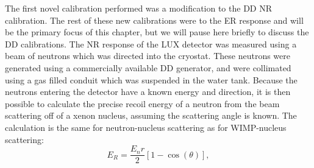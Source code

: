 The first novel calibration performed was a modification to the DD NR calibration. The rest of these new calibrations were to the ER response and will be the primary focus of this chapter, but we will pause here briefly to discuss the DD calibrations. The NR response of the LUX detector was measured using a beam of neutrons which was directed into the cryostat. These neutrons were generated using a commercially available DD generator, and were collimated using a gas filled conduit which was suspended in the water tank. Because the neutrons entering the detector have a known energy and direction, it is then possible to calculate the precise recoil energy of a neutron from the beam scattering off of a xenon nucleus, assuming the scattering angle is known. The calculation is the same for neutron-nucleus scattering as for WIMP-nucleus scattering:
\begin{equation}
E_R=\frac{E_nr}{2}[1-\cos(\theta)],
\end{equation}
